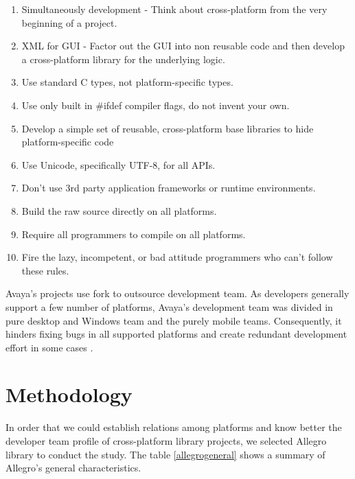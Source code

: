 \documentclass[10pt, conference]{IEEEtran}
\begin{document}
\begin{enumerate}
\item Simultaneously development - Think about cross-platform from the very beginning of a project.  
\item XML for GUI - Factor out the GUI into non reusable code and then develop a cross-platform library for the underlying logic.
\item Use standard C types, not platform-specific types.
\item Use only built in \#ifdef compiler flags, do not invent your own.
\item Develop a simple set of reusable, cross-platform base libraries to hide platform-specific code
\item Use Unicode, specifically UTF-8, for all APIs.
\item Don’t use 3rd party application frameworks or runtime environments. 
\item Build the raw source directly on all platforms.
\item Require all programmers to compile on all platforms.
\item Fire the lazy, incompetent, or bad attitude programmers who can’t follow these rules.
\end{enumerate}

Avaya's projects use fork to outsource development team. As developers generally support a few number of platforms, Avaya's development team  was divided in pure desktop and Windows team and the purely mobile teams. Consequently, it hinders fixing bugs  in all supported platforms and create redundant development effort in some cases \cite{Duc2014}.  



\section{Methodology}


In order that we could establish relations among platforms and know better the developer team profile of cross-platform library projects, we selected Allegro library to conduct the study. The table \ref{allegrogeneral} shows a summary of Allegro’s general characteristics.  
\end{document}
